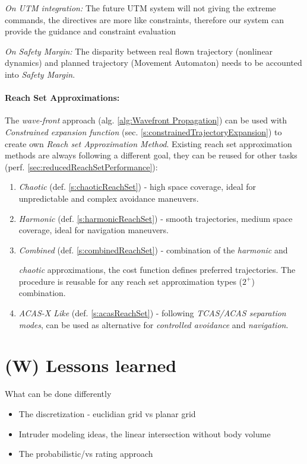 \begin{note}
    \emph{On UTM integration:} The future UTM system will not giving the extreme commands, the directives are more like constraints, therefore our system can provide the guidance and constraint evaluation
\end{note}

\begin{note}
    \emph{On Safety Margin:} The disparity between real flown trajectory (nonlinear dynamics) and planned trajectory (Movement Automaton) needs to be accounted into \emph{Safety Margin}.
\end{note}

\paragraph{Reach Set Approximations:} The \emph{wave-front} approach (alg. \ref{alg:Wavefront Propagation}) can be used with \emph{Constrained expansion function} (sec. \ref{s:constrainedTrajectoryExpansion}) to create own \emph{Reach set Approximation Method}. Existing  reach set approximation methods are always following a different goal, they can be reused for other tasks (perf. \ref{sec:reducedReachSetPerformance}):

\begin{enumerate}
    \item \emph{Chaotic} (def. \ref{s:chaoticReachSet}) - high space coverage, ideal for unpredictable and complex avoidance maneuvers.
    
    \item \emph{Harmonic} (def. \ref{s:harmonicReachSet}) - smooth trajectories, medium space coverage, ideal for navigation maneuvers.
    \item \emph{Combined} (def. \ref{s:combinedReachSet}) - combination of the \emph{harmonic} and 
    
    \emph{chaotic} approximations, the cost function defines preferred trajectories. The procedure is reusable for any reach set approximation types ($2^+$) combination.
    
    \item \emph{ACAS-X Like} (def. \ref{s:acasReachSet}) - following \emph{TCAS/ACAS separation modes}, can be used as alternative for \emph{controlled avoidance} and \emph{navigation}.
\end{enumerate}


\section{(W) Lessons learned}
What can be done differently
\begin{itemize}
	\item The discretization - euclidian grid vs planar grid
	\item Intruder modeling ideas, the linear intersection without body volume
	\item The probabilistic/vs rating approach
\end{itemize}


